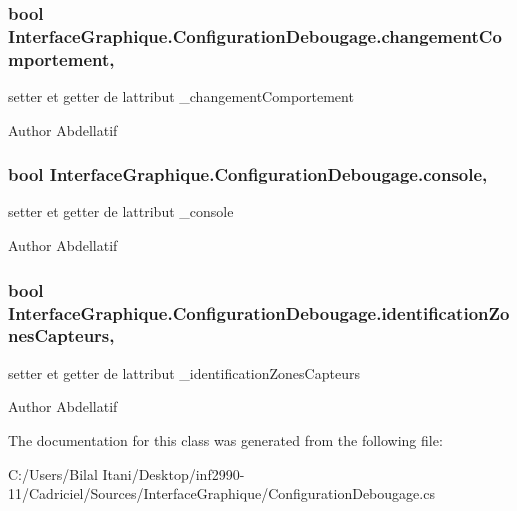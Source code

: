 \subsubsection[{\texorpdfstring{changement\+Comportement}{changementComportement}}]{\setlength{\rightskip}{0pt plus 5cm}bool Interface\+Graphique.\+Configuration\+Debougage.\+changement\+Comportement\hspace{0.3cm}{\ttfamily [get]}, {\ttfamily [set]}}\hypertarget{class_interface_graphique_1_1_configuration_debougage_a658c6e3c08fc26996b7e4a213050d13f}{}\label{class_interface_graphique_1_1_configuration_debougage_a658c6e3c08fc26996b7e4a213050d13f}
setter et getter de l\textquotesingle{}attribut \+\_\+changement\+Comportement \begin{DoxyAuthor}{Author}
Abdellatif 
\end{DoxyAuthor}
\subsubsection[{\texorpdfstring{console}{console}}]{\setlength{\rightskip}{0pt plus 5cm}bool Interface\+Graphique.\+Configuration\+Debougage.\+console\hspace{0.3cm}{\ttfamily [get]}, {\ttfamily [set]}}\hypertarget{class_interface_graphique_1_1_configuration_debougage_a04f2f5464086a4b97fc980e610478796}{}\label{class_interface_graphique_1_1_configuration_debougage_a04f2f5464086a4b97fc980e610478796}
setter et getter de l\textquotesingle{}attribut \+\_\+console \begin{DoxyAuthor}{Author}
Abdellatif 
\end{DoxyAuthor}
\subsubsection[{\texorpdfstring{identification\+Zones\+Capteurs}{identificationZonesCapteurs}}]{\setlength{\rightskip}{0pt plus 5cm}bool Interface\+Graphique.\+Configuration\+Debougage.\+identification\+Zones\+Capteurs\hspace{0.3cm}{\ttfamily [get]}, {\ttfamily [set]}}\hypertarget{class_interface_graphique_1_1_configuration_debougage_aad0771618af1abdaf4ef2fdc0a265403}{}\label{class_interface_graphique_1_1_configuration_debougage_aad0771618af1abdaf4ef2fdc0a265403}
setter et getter de l\textquotesingle{}attribut \+\_\+identification\+Zones\+Capteurs \begin{DoxyAuthor}{Author}
Abdellatif 
\end{DoxyAuthor}


The documentation for this class was generated from the following file\+:\begin{DoxyCompactItemize}
\item 
C\+:/\+Users/\+Bilal Itani/\+Desktop/inf2990-\/11/\+Cadriciel/\+Sources/\+Interface\+Graphique/Configuration\+Debougage.\+cs\end{DoxyCompactItemize}
